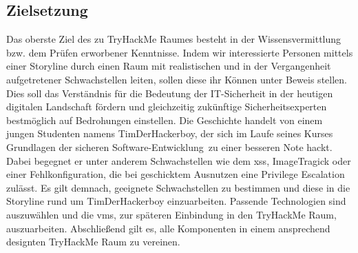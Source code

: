 \documentclass[11pt, a4paper,onecolumn ,titlepage]{article}
\begin{document}
    \subsection{Zielsetzung}
    \label{subsec:zielsetzung}
    Das oberste Ziel des zu TryHackMe Raumes besteht in der Wissensvermittlung bzw. dem Prüfen erworbener Kenntnisse.
    Indem wir interessierte Personen mittels einer Storyline durch einen Raum mit realistischen und in der Vergangenheit aufgetretener Schwachstellen leiten, sollen diese ihr Können unter Beweis stellen.
    Dies soll das Verständnis für die Bedeutung der IT-Sicherheit in der heutigen digitalen Landschaft fördern und gleichzeitig zukünftige Sicherheitsexperten bestmöglich auf Bedrohungen einstellen.
    Die Geschichte handelt von einem jungen Studenten namens TimDerHackerboy, der sich im Laufe seines Kurses \glqq Grundlagen der sicheren Software-Entwicklung\grqq\ zu einer besseren Note hackt.
    Dabei begegnet er unter anderem Schwachstellen wie dem \ac{xss}, ImageTragick oder einer Fehlkonfiguration, die bei geschicktem Ausnutzen eine Privilege Escalation zulässt.
    Es gilt demnach, geeignete Schwachstellen zu bestimmen und diese in die Storyline rund um TimDerHackerboy einzuarbeiten.
    Passende Technologien sind auszuwählen und die \ac{vm}s, zur späteren Einbindung in den TryHackMe Raum, auszuarbeiten.
    Abschließend gilt es, alle Komponenten in einem ansprechend designten TryHackMe Raum zu vereinen.
\end{document}
